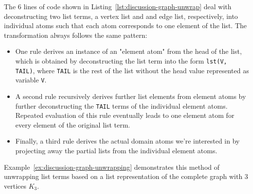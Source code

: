 The 6 lines of code shown in Listing~\ref{lst:discussion-graph-unwrap} deal with deconstructing two list terms, a vertex list and and edge list, respectively, into individual atoms such that each atom corresponds to one element of the list.
The transformation always follows the same pattern:
\begin{itemize}
    \item One rule derives an instance of an "element atom" from the head of the list, which is obtained by deconstructing the list term into the form \texttt{lst(V, TAIL)}, where \texttt{TAIL} is the rest of the list without the head value represented as variable \texttt{V}.
    \item A second rule recursively derives further list elements from element atoms by further deconstructing the \texttt{TAIL} terms of the individual element atoms. Repeated evaluation of this rule eventually leads to one element atom for every element of the original list term.
    \item Finally, a third rule derives the actual domain atoms we're interested in by projecting away the partial lists from the individual element atoms.
\end{itemize}    

Example~\ref{ex:discussion-graph-unwrapping} demonstrates this method of unwrapping list terms based on a list representation of the complete graph with 3 vertices $K_3$.

